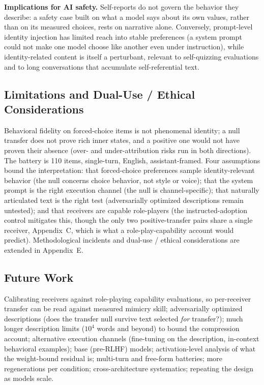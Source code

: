 \documentclass[11pt]{article}
\begin{document}
\textbf{Implications for AI safety.} Self-reports do not govern the behavior
they describe: a safety case built on what a model says about its own values,
rather than on its measured choices, rests on narrative alone.
Conversely, prompt-level identity injection has
limited reach into stable preferences (a system prompt could not make one
model choose like another even under instruction), while identity-related
content is itself a perturbant, relevant to self-quizzing evaluations and to
long conversations that accumulate self-referential text.

\subsection*{Limitations and Dual-Use / Ethical Considerations}
Behavioral fidelity on forced-choice items is not phenomenal identity; a null
transfer does not prove rich inner states, and a positive one would not have
proven their absence (over- and under-attribution risks run in both
directions). The battery is 110 items, single-turn, English, assistant-framed.
Four assumptions bound the interpretation: that forced-choice preferences
sample identity-relevant behavior (the null concerns choice behavior, not
style or voice); that the system prompt is the right execution channel (the
null is channel-specific); that naturally articulated text is the right test
(adversarially optimized descriptions remain untested); and that receivers are
capable role-players (the instructed-adoption control mitigates this, though
the only two positive-transfer pairs share a single receiver, Appendix~C,
which is what a role-play-capability account would predict). Methodological
incidents and dual-use / ethical considerations are extended in Appendix~E.

\subsection*{Future Work}
Calibrating receivers against role-playing capability evaluations, so
per-receiver transfer can be read against measured mimicry skill;
adversarially optimized descriptions (does the transfer null survive text
selected \emph{for} transfer?); much longer description limits ($10^4$ words
and beyond) to bound the compression account; alternative execution channels
(fine-tuning on
the description, in-context behavioral examples); base (pre-RLHF) models;
activation-level analysis of what the weight-bound residual is; multi-turn and
free-form batteries; more regenerations per condition; cross-architecture
systematics; repeating the design as models scale.
\end{document}
